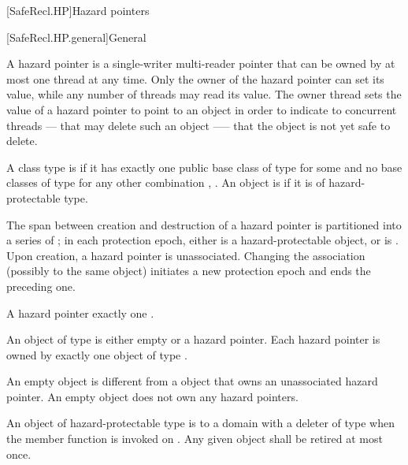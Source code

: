 
[SafeRecl.HP]{Hazard pointers}

[SafeRecl.HP.general]{General}


\pnum
A hazard pointer is a single-writer multi-reader pointer that can be owned by at most one thread at any time. Only the owner of the hazard pointer can set its value, while any number of threads may read its value. The owner thread sets the value of a hazard pointer to point to an object in order to indicate to concurrent threads --- that may delete such an object --— that the object is not yet safe to delete.

\pnum
A class type  is  if it has exactly one public base class of type \linebreak {} for some  and no base classes of type  for any other combination , . An object is  if it is of hazard-protectable type.

\pnum
The span between creation and destruction of a hazard pointer  is partitioned into a series of ; in each protection epoch,  either is  a hazard-protectable object, or is . Upon creation, a hazard pointer is unassociated. Changing the association (possibly to the same object) initiates a new protection epoch and ends the preceding one.

\pnum
A hazard pointer  exactly one . 

\pnum
An object of type  is either empty or  a hazard pointer. Each hazard pointer is owned by exactly one object of type . \begin{note} An empty  object is different from a  object that owns an unassociated hazard pointer. An empty  object does not own any hazard pointers. \end{note}

\pnum
An object  of hazard-protectable type  is  to a domain with a deleter of type  when the member function  is invoked on . Any given object  shall be retired at most once.

